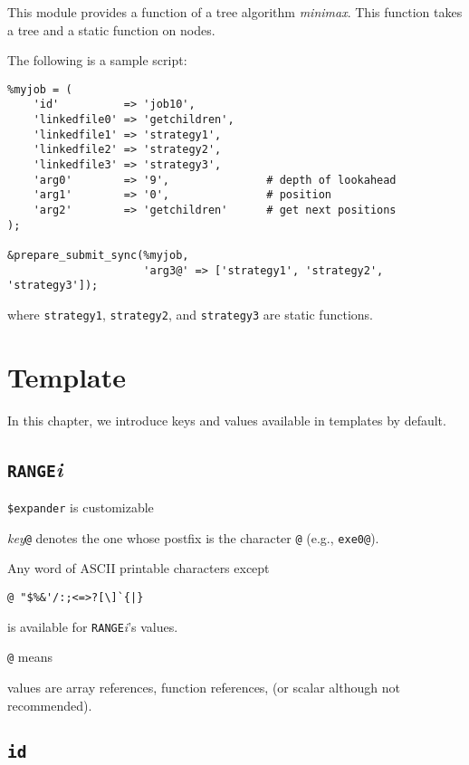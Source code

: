 \documentclass[a4paper,10pt]{report}
\begin{document}
This module provides a function of a tree algorithm \textit{minimax}.
This function takes a tree and a static function on nodes.

The following is a sample script:
\begin{boxnote}
\begin{verbatim}
%myjob = (
    'id'          => 'job10',
    'linkedfile0' => 'getchildren',
    'linkedfile1' => 'strategy1',
    'linkedfile2' => 'strategy2',
    'linkedfile3' => 'strategy3',
    'arg0'        => '9',               # depth of lookahead
    'arg1'        => '0',               # position
    'arg2'        => 'getchildren'      # get next positions
);

&prepare_submit_sync(%myjob,
                     'arg3@' => ['strategy1', 'strategy2', 'strategy3']);
\end{verbatim}
\end{boxnote}
\noindent
where \texttt{strategy1}, \texttt{strategy2}, and
\texttt{strategy3} are static functions.

\chapter{Template}\label{chapjobdefhash}

In this chapter, we introduce keys and values available in templates
by default.

\section{\texttt{RANGE}\textit{i}}

\texttt{\$expander} is customizable

\textit{key}\texttt{@} denotes the one whose postfix is the
character \texttt{@} (e.g., \texttt{exe0@}).


Any word of ASCII printable characters except
\begin{center}
\verb*+@ "$%&'/:;<=>?[\]`{|}+        %
\end{center}
is available for \texttt{RANGE}\textit{i}'s values.

\texttt{@} means

values are array references, function references, (or scalar although
not recommended).

\section{\texttt{id}}
\end{document}
